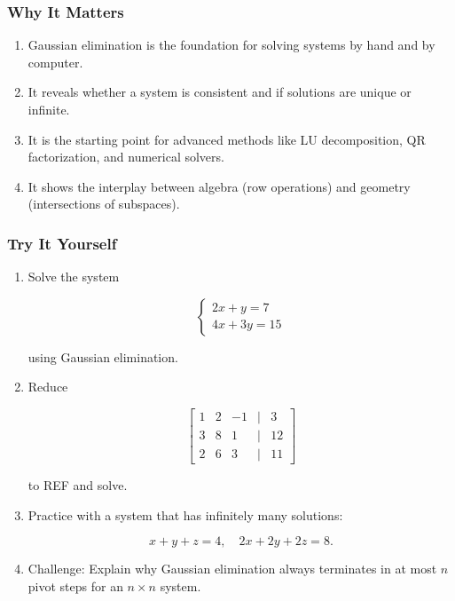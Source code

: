 \documentclass[
  letterpaper,
  DIV=11,
  numbers=noendperiod]{scrreprt}
\providecommand{\tightlist}{%
  \setlength{\itemsep}{0pt}\setlength{\parskip}{0pt}}
\begin{document}
\subsubsection{Why It Matters}\label{why-it-matters-23}

\begin{enumerate}
\def\labelenumi{\arabic{enumi}.}
\tightlist
\item
  Gaussian elimination is the foundation for solving systems by hand and
  by computer.
\item
  It reveals whether a system is consistent and if solutions are unique
  or infinite.
\item
  It is the starting point for advanced methods like LU decomposition,
  QR factorization, and numerical solvers.
\item
  It shows the interplay between algebra (row operations) and geometry
  (intersections of subspaces).
\end{enumerate}

\subsubsection{Try It Yourself}\label{try-it-yourself-26}

\begin{enumerate}
\def\labelenumi{\arabic{enumi}.}
\item
  Solve the system

  \[
  \begin{cases}  
  2x + y = 7 \\  
  4x + 3y = 15  
  \end{cases}
  \]

  using Gaussian elimination.
\item
  Reduce

  \[
  \begin{bmatrix}  
  1 & 2 & -1 & | & 3 \\  
  3 & 8 & 1 & | & 12 \\  
  2 & 6 & 3 & | & 11  
  \end{bmatrix}
  \]

  to REF and solve.
\item
  Practice with a system that has infinitely many solutions:

  \[
  x + y + z = 4, \quad 2x + 2y + 2z = 8.
  \]
\item
  Challenge: Explain why Gaussian elimination always terminates in at
  most \(n\) pivot steps for an \(n \times n\) system.
\end{enumerate}
\end{document}
